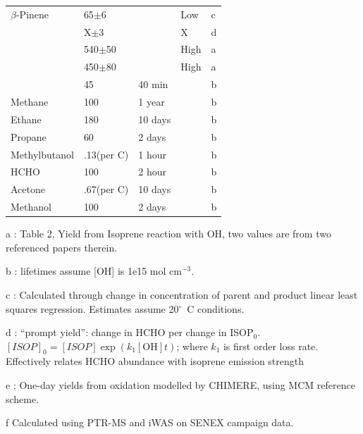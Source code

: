 \begin{table}
\begin{threeparttable}
\begin{tabular}{  l  l  l  l  l  }
        $\beta$-Pinene  & 65$\pm$6        &        & Low           & c      \\ 
                        & X$\pm$3         &        & X             & d      \\ 
                        & 540$\pm$50      &        & High          & a     \\ 
                        & 450$\pm$80      &        & High          & a      \\ 
                        & 45              & 40 min &              & b      \\ %
        Methane 	      & 100             & 1 year  &             & b     \\ 
        Ethane          & 180             & 10 days &             & b     \\ 
        Propane         & 60              & 2 days  &             & b     \\ 
        Methylbutanol   & .13(per C)    & 1 hour  &             & b     \\ 
        HCHO            & 100             & 2 hour  &             & b     \\ 
        Acetone         & .67(per C)      & 10 days &             & b     \\ 
        Methanol        & 100             & 2 days  &             & b     \\ %
        \bottomrule
      \end{tabular}
      \begin{tablenotes} %
        \item a \textcite{AtkinsonArey2003}: Table 2, Yield from Isoprene reaction with OH, two values are from two referenced papers therein.
        \item b \textcite{Palmer2003}: lifetimes assume [OH] is 1e15 mol cm$^{-3}$.
        \item c \parencite{Lee2006}: Calculated through change in concentration of parent and product linear least squares regression.
        Estimates assume 20$^\circ$~C conditions.
        \item d \textcite{Wolfe2016}: ``prompt yield'': change in HCHO per change in ISOP$_0$.
        $[ISOP]_0=[ISOP]\exp(k_1[\mathrm{OH}]t)$; where $k_1$ is first order loss rate.
        Effectively relates HCHO abundance with isoprene emission strength
        \item e \textcite{Dufour2009}: One-day yields from oxidation modelled by CHIMERE, using MCM reference scheme.
        \item f Calculated using PTR-MS and iWAS on SENEX campaign data.
      \end{tablenotes}
      \label{BioIsop:Method:tab_VOCLiteratureYields}
    \end{threeparttable} \end{table}
  
